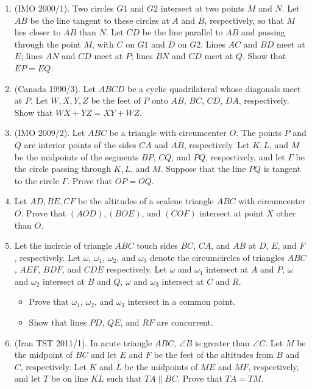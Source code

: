 \documentclass[11pt]{scrartcl}
\begin{document}
\begin{enumerate}
    \item (IMO 2000/1). Two circles $G1$ and $G2$ intersect at two points $M$ and $N$. Let $AB$ be the line tangent to these circles at $A$ and $B$, respectively, so that $M$ lies closer to $AB$ than $N$. Let $CD$ be the line parallel to $AB$ and passing through the point $M$, with $C$ on $G1$ and $D$ on $G2$. Lines $AC$ and $BD$ meet at $E$; lines $AN$ and $CD$ meet at $P$; lines $BN$ and $CD$ meet at $Q$. Show that $EP = EQ$.
    
    \item (Canada 1990/3). Let $ABCD$ be a cyclic quadrilateral whose diagonals meet at $P$. Let $W, X, Y , Z$ be the feet of $P$ onto $AB$, $BC$, $CD$, $DA$, respectively. Show that $WX + YZ = XY + WZ$.
    
    \item (IMO 2009/2). Let $ABC$ be a triangle with circumcenter $O$. The points $P$ and $Q$ are interior points of the sides $CA$ and $AB$, respectively. Let $K, L$, and $M$ be the midpoints of the segments $BP$, $CQ$, and $PQ$, respectively, and let $\Gamma$ be the circle passing through $K, L$, and $M$. Suppose that the line $PQ$ is tangent to the circle $\Gamma$. Prove that $OP = OQ$.
    
    \item Let $AD, BE, CF$ be the altitudes of a scalene triangle $ABC$ with circumcenter $O$. Prove that $(AOD), (BOE)$, and $(COF)$ intersect at point $X$ other than $O$.
    
    \item Let the incircle of triangle $ABC$ touch sides $BC$, $CA$, and $AB$ at $D$, $E$, and $F$, respectively. Let $\omega$, $\omega_1$, $\omega_2$, and $\omega_3$ denote the circumcircles of triangles $ABC$, $AEF$, $BDF$, and $CDE$ respectively. Let $\omega$ and $\omega_1$ intersect at $A$ and $P$, $\omega$ and $\omega_2$ intersect at $B$ and $Q$, $\omega$ and $\omega_3$ intersect at $C$ and $R$.
    \begin{itemize}[(a)]
        \item Prove that $\omega_1$, $\omega_2$, and $\omega_3$ intersect in a common point.
        \item Show that lines $PD$, $QE$, and $RF$ are concurrent.
    \end{itemize}
    
    \item (Iran TST 2011/1). In acute triangle $ABC$, $\angle B$ is greater than $\angle C$. Let $M$ be the midpoint of $BC$ and let $E$ and $F$ be the feet of the altitudes from $B$ and $C$, respectively. Let $K$ and $L$ be the midpoints of $ME$ and $MF$, respectively, and let $T$ be on line $KL$ such that $TA\parallel BC$. Prove that $TA = TM$.
\end{enumerate}
\end{document}
